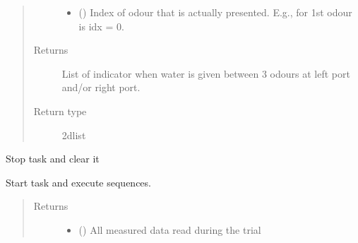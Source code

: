 \documentclass[letterpaper,10pt,english]{sphinxmanual}
\begin{document}
\begin{fulllineitems}
\begin{fulllineitems}
\begin{quote}
\begin{description}
\begin{itemize}
\item {} 
\sphinxAtStartPar
{} () \textendash{} Index of odour that is actually presented. E.g., for 1st odour is
idx = 0.

\end{itemize}

\item[{Returns}] \leavevmode
\sphinxAtStartPar
{} \textendash{} List of indicator when water is given between 3 odours at left port
and/or right port.

\item[{Return type}] \leavevmode
\sphinxAtStartPar
2d\sphinxhyphen{}list

\end{description}\end{quote}

\end{fulllineitems}


\begin{fulllineitems}
\label{\detokenize{NoSeMazeControl/daqface:daqface.DAQ.DoAiConcatenatedWaitTrainingMultiTask.ClearTasks}}
\pysigstartsignatures
{}
\pysigstopsignatures
\sphinxAtStartPar
Stop task and clear it

\end{fulllineitems}


\begin{fulllineitems}
\label{\detokenize{NoSeMazeControl/daqface:daqface.DAQ.DoAiConcatenatedWaitTrainingMultiTask.DoTask}}
\pysigstartsignatures
{}
\pysigstopsignatures
\sphinxAtStartPar
Start task and execute sequences.
\begin{quote}\begin{description}
\item[{Returns}] \leavevmode
\sphinxAtStartPar
\begin{itemize}
\item {} 
\sphinxAtStartPar
{} () \textendash{} All measured data read during the trial


\end{itemize}
\end{description}
\end{quote}
\end{fulllineitems}
\end{fulllineitems}
\end{document}

